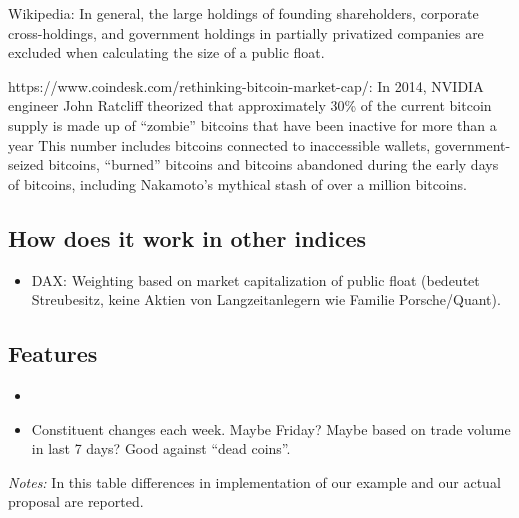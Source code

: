 \documentclass[11pt]{article}
\newcommand\fnotes[1]{\captionsetup{font=scriptsize}\caption*{\textsl{Notes:} #1}}
\begin{document}
Wikipedia:  In general, the large holdings of founding shareholders, corporate cross-holdings, and government holdings in partially privatized companies are excluded when calculating the size of a public float.

https://www.coindesk.com/rethinking-bitcoin-market-cap/: In 2014, NVIDIA engineer John Ratcliff theorized that approximately 30\% of the current bitcoin supply is made up of ``zombie'' bitcoins that have been inactive for more than a year This number includes bitcoins connected to inaccessible wallets, government-seized bitcoins, ``burned'' bitcoins and bitcoins abandoned during the early days of bitcoins, including Nakamoto's mythical stash of over a million bitcoins.

\subsection{How does it work in other indices}

\begin{itemize}
  \item DAX: Weighting based on market capitalization of public float (bedeutet Streubesitz, keine Aktien von Langzeitanlegern  wie Familie Porsche/Quant).
\end{itemize}

\subsection{Features}

\begin{itemize}
  \item
  \item Constituent changes each week. Maybe Friday? Maybe based on trade volume in last 7 days? Good against ``dead coins''.
\end{itemize}

\begin{table}
\caption{Table explaining differences: proposal vs.\ example}
\centering
{}
\fnotes{In this table differences in implementation of our example and our actual proposal are reported.}
\end{table}
\end{document}
